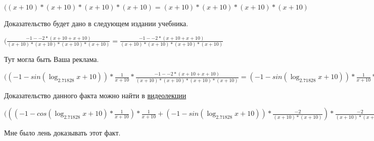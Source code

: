 \documentclass[12pt,a4paper,fleqn]{article}
\theoremstyle{definition}
\begin{document}
$(( x  +  10 ) * ( x  +  10 ) * ( x  +  10 ) * ( x  +  10 ) = ( x  +  10 ) * ( x  +  10 ) * ( x  +  10 ) * ( x  +  10 )$

Доказательство будет дано в следующем издании учебника.

$(\frac{ -1  -  -2  * ( x  +  10  +  x  +  10 )}{( x  +  10 ) * ( x  +  10 ) * ( x  +  10 ) * ( x  +  10 )}
 = \frac{ -1  -  -2  * ( x  +  10  +  x  +  10 )}{( x  +  10 ) * ( x  +  10 ) * ( x  +  10 ) * ( x  +  10 )}
$

Тут могла быть Ваша реклама.

$(( -1  - sin(\log_{ 2.71828 }{ x  +  10 })) * \frac{ 1 }{ x  +  10 }
 * \frac{ -1  -  -2  * ( x  +  10  +  x  +  10 )}{( x  +  10 ) * ( x  +  10 ) * ( x  +  10 ) * ( x  +  10 )}
 = ( -1  - sin(\log_{ 2.71828 }{ x  +  10 })) * \frac{ 1 }{ x  +  10 }
 * \frac{ -1  -  -2  * ( x  +  10  +  x  +  10 )}{( x  +  10 ) * ( x  +  10 ) * ( x  +  10 ) * ( x  +  10 )}
$

Доказательство данного факта можно найти в \href{https://www.youtube.com/watch?v=dQw4w9WgXcQ}{видеолекции}

$((( -1  - cos(\log_{ 2.71828 }{ x  +  10 }) * \frac{ 1 }{ x  +  10 }
) * \frac{ 1 }{ x  +  10 }
 + ( -1  - sin(\log_{ 2.71828 }{ x  +  10 })) * \frac{ -2 }{( x  +  10 ) * ( x  +  10 )}
) * \frac{ -2 }{( x  +  10 ) * ( x  +  10 )}
 + ( -1  - sin(\log_{ 2.71828 }{ x  +  10 })) * \frac{ 1 }{ x  +  10 }
 * \frac{ -1  -  -2  * ( x  +  10  +  x  +  10 )}{( x  +  10 ) * ( x  +  10 ) * ( x  +  10 ) * ( x  +  10 )}
 = (( -1  - cos(\log_{ 2.71828 }{ x  +  10 }) * \frac{ 1 }{ x  +  10 }
) * \frac{ 1 }{ x  +  10 }
 + ( -1  - sin(\log_{ 2.71828 }{ x  +  10 })) * \frac{ -2 }{( x  +  10 ) * ( x  +  10 )}
) * \frac{ -2 }{( x  +  10 ) * ( x  +  10 )}
 + ( -1  - sin(\log_{ 2.71828 }{ x  +  10 })) * \frac{ 1 }{ x  +  10 }
 * \frac{ -1  -  -2  * ( x  +  10  +  x  +  10 )}{( x  +  10 ) * ( x  +  10 ) * ( x  +  10 ) * ( x  +  10 )}
$

Мне было лень доказывать этот факт.
\end{document}

